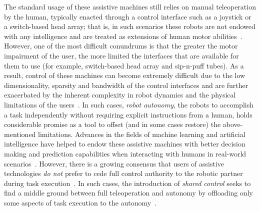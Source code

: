 \documentclass[12pt]{article}
\begin{document}
%
%
The standard usage of these assistive machines still relies on manual teleoperation by the human, typically enacted through a control interface such as a joystick or a switch-based head array; that is, in such scenarios these robots are not endowed with any intelligence and are treated as extensions of human motor abilities~\cite{simpson2008tooth}. However, one of the most difficult conundrums is that the greater the motor impairment of the user, the more limited the interfaces that are available for them to use (for example, switch-based head array and sip-n-puff tubes). As a result, control of these machines can become extremely difficult due to the low dimensionality, sparsity and bandwidth of the control interfaces and are further exacerbated by the inherent complexity in robot dynamics and the physical limitations of the users~\cite{pilarski2012dynamic}.
In such cases, \textit{robot autonomy}, the  robots to accomplish a task independently without requiring explicit instructions from a human, holds considerable promise as a tool to offset (and in some cases restore) the above-mentioned limitations. Advances in the fields of machine learning and artificial intelligence have helped to endow these assistive machines with better decision making and prediction capabilities when interacting with humans in real-world scenarios~\cite{huang2015using}.
However, there is a growing consensus that users of assistive technologies \textit{do not} prefer to cede full control authority to the robotic partner during task execution~\cite{gopinath2017human}. In such cases, the introduction of \textit{shared control} seeks to find a middle ground between full teleoperation and autonomy by offloading only some aspects of task execution to the autonomy~\cite{wasson2003user, demeester2008user}. 
\end{document}
